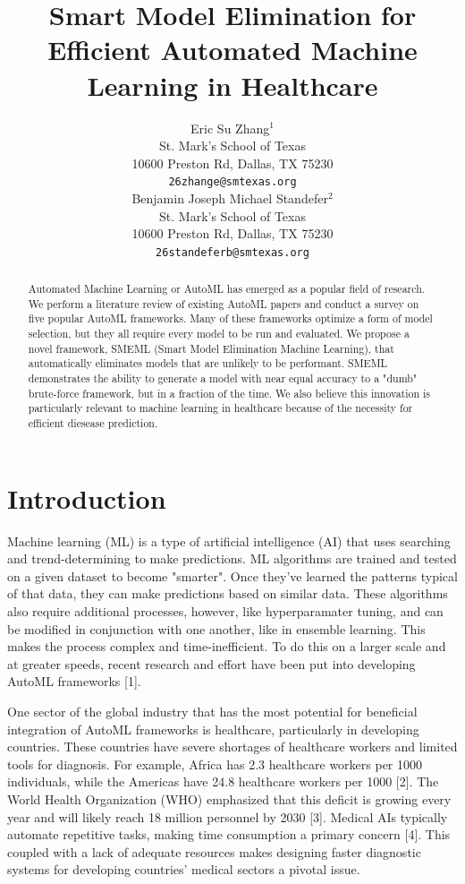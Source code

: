 \documentclass{article}
\title{Smart Model Elimination for Efficient Automated Machine Learning in Healthcare}
\author{%
  Eric Su Zhang$^1$ \\
  St. Mark's School of Texas\\
  10600 Preston Rd, Dallas, TX 75230\\
  \texttt{26zhange@smtexas.org} \\
  \And
  Benjamin Joseph Michael Standefer$^2$ \\
  St. Mark's School of Texas \\
  10600 Preston Rd, Dallas, TX 75230 \\
  \texttt{26standeferb@smtexas.org} \\
}
\begin{document}
\maketitle


\begin{abstract}
  Automated Machine Learning or AutoML has emerged as a popular field of research. We perform a literature review of existing AutoML papers and conduct a survey on five popular AutoML frameworks. Many of these frameworks optimize a form of model selection, but they all require every model to be run and evaluated. We propose a novel framework, SMEML (Smart Model Elimination Machine Learning), that automatically eliminates models that are unlikely to be performant. SMEML demonstrates the ability to generate a model with near equal accuracy to a "dumb" brute-force framework, but in a fraction of the time. We also believe this innovation is particularly relevant to machine learning in healthcare because of the necessity for efficient diesease prediction. 
\end{abstract}


\section{Introduction}

Machine learning (ML) is a type of artificial intelligence (AI) that uses searching and trend-determining to make predictions. ML algorithms are trained and tested on a given dataset to become "smarter". Once they've learned the patterns typical of that data, they can make predictions based on similar data. These algorithms also require additional processes, however, like hyperparamater tuning, and can be modified in conjunction with one another, like in ensemble learning. This makes the process complex and time-inefficient. To do this on a larger scale and at greater speeds, recent research and effort have been put into developing AutoML frameworks [1].

One sector of the global industry that has the most potential for beneficial integration of AutoML frameworks is healthcare, particularly in developing countries. These countries have severe shortages of healthcare workers and limited tools for diagnosis. For example, Africa has 2.3 healthcare workers per 1000 individuals, while the Americas have 24.8 healthcare workers per 1000 [2]. The World Health Organization (WHO) emphasized that this deficit is growing every year and will likely reach 18 million personnel by 2030 [3]. Medical AIs typically automate repetitive tasks, making time consumption a primary concern [4]. This coupled with a lack of adequate resources makes designing faster diagnostic systems for developing countries' medical sectors a pivotal issue. 
\end{document}
